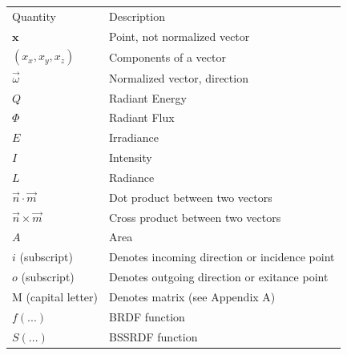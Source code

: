 \renewcommand{\arraystretch}{1.2}
\begin{table}[h]
\begin{tabular}{|l|l|}
\hline
Quantity                           & Description                                             \\ %
$\mathbf{x}$                       & Point, not normalized vector                            \\ %
$(x_x,x_y,x_z)$                    & Components of a vector                                  \\ %
$\vec{\omega}$                     & Normalized vector, direction                            \\ %
$Q$                                & Radiant Energy                                          \\ %
$\Phi$                             & Radiant Flux                                            \\ %
$E$                                & Irradiance                                              \\ %
$I$                                & Intensity                                               \\ %
$L$                                & Radiance                                                \\ %
$\vec{n} \cdot \vec{m}$            & Dot product between two vectors                         \\ %
$\vec{n} \times \vec{m}$           & Cross product between two vectors                       \\ %
$A$                                & Area                                                    \\ %
$i$ (subscript)                    & Denotes incoming direction or incidence point           \\ %
$o$ (subscript)                    & Denotes outgoing direction or exitance point            \\ %
M (capital letter)                 & Denotes matrix (see Appendix A)                         \\ %
$f(...)$                           & BRDF function                                           \\ %
$S(...)$                           & BSSRDF function                                         \\ %

\end{tabular}
\end{table}
